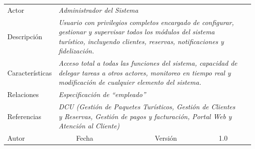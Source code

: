 \newpage




\begin{table}[H]
    \begin{tabular}{llllllll}
    \cline{1-7}
    \multicolumn{1}{|l|}{Actor}           & \multicolumn{4}{l|}{{\color[HTML]{A6A6A6} \textit{Administrador del Sistema}}}                                                        & \multicolumn{2}{l|}{\cellcolor[HTML]{E6E6E6}{\color[HTML]{A6A6A6} \textit{AC-2}}}                         &  \\ \cline{1-7}
    \multicolumn{1}{|l|}{Descripción}     & \multicolumn{6}{p{12cm}|}{{\color[HTML]{A6A6A6} \textit{Usuario con privilegios completos encargado de configurar, gestionar y supervisar todos los módulos del sistema turístico, incluyendo clientes, reservas, notificaciones y fidelización.}}}     &  \\ \cline{1-7}
    \multicolumn{1}{|l|}{Características} & \multicolumn{6}{p{12cm}|}{{\color[HTML]{A6A6A6} \textit{Acceso total a todas las funciones del sistema, capacidad de delegar tareas a otros actores, monitoreo en tiempo real y modificación de cualquier elemento del sistema.}}} &  \\ \cline{1-7}
    \multicolumn{1}{|l|}{Relaciones}      & \multicolumn{6}{p{12cm}|}{{\color[HTML]{A6A6A6} \textit{Especificación de ``empleado''}}} &  \\ \cline{1-7}
    \multicolumn{1}{|l|}{Referencias}     & \multicolumn{6}{p{10cm}|}{{\color[HTML]{A6A6A6} \textit{DCU (Gestión de Paquetes Turísticos, Gestión de Clientes y Reservas, Gestión de pagos y facturación, Portal Web y Atención al Cliente)}}}                                                                                              &  \\ \cline{1-7}
    \multicolumn{1}{|l|}{Autor}           & \multicolumn{1}{l|}{}              & \multicolumn{1}{l|}{Fecha}              & \multicolumn{1}{l|}{}              & \multicolumn{2}{l|}{Versión}                            & \multicolumn{1}{l|}{1.0}                                        &  \\ \cline{1-7}
    \end{tabular}
\end{table}

